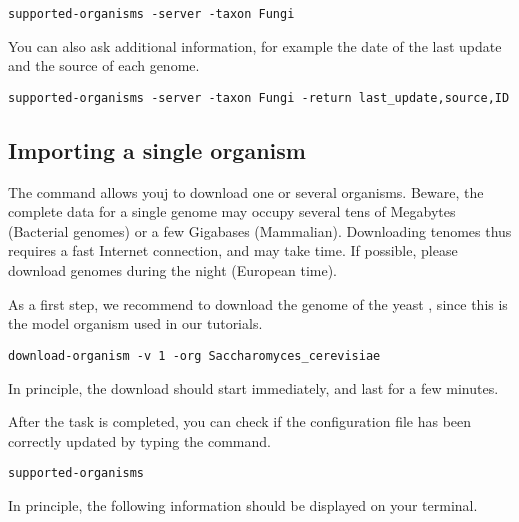 \begin{footnotesize}
\begin{verbatim}
supported-organisms -server -taxon Fungi
\end{verbatim}
\end{footnotesize}

You can also ask additional information, for example the date of the
last update and the source of each genome.

\begin{footnotesize}
\begin{verbatim}
supported-organisms -server -taxon Fungi -return last_update,source,ID
\end{verbatim}
\end{footnotesize}


\subsection{Importing a single organism}


The command  allows youj to download one or
several organisms. Beware, the complete data for a single genome may
occupy several tens of Megabytes (Bacterial genomes) or a few
Gigabases (Mammalian). Downloading tenomes thus requires a fast
Internet connection, and may take time. If possible, please download
genomes during the night (European time).

As a first step, we recommend to download the genome of the yeast
, since this is the model organism used
in our tutorials.


\begin{footnotesize}
\begin{verbatim}
download-organism -v 1 -org Saccharomyces_cerevisiae
\end{verbatim}
\end{footnotesize}

In principle, the download should start immediately, and last for a
few minutes.

After the task is completed, you can check if the configuration file
has been correctly updated by typing the command.

\begin{footnotesize}
\begin{verbatim}
supported-organisms
\end{verbatim}
\end{footnotesize}

In principle, the following information should be displayed on your
terminal.

